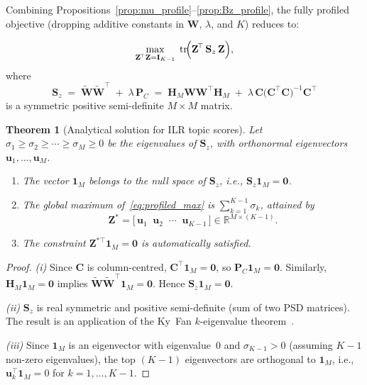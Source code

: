 \documentclass{article}
\newtheorem{theorem}{Theorem}
\DeclareMathOperator{\tr}{tr}
\begin{document}
Combining Propositions~\ref{prop:mu_profile}--\ref{prop:Bz_profile},
the fully profiled objective (dropping additive constants in
$\mathbf{W}$, $\lambda$, and $K$) reduces to:

\begin{equation}
  \max_{\mathbf{Z}^{\!\top}\mathbf{Z}=\mathbf{I}_{K-1}}\;
  \tr\!\Bigl(
    \mathbf{Z}^{\!\top}\,\mathbf{S}_z\,\mathbf{Z}
  \Bigr),
  \label{eq:profiled_max}
\end{equation}
where
\begin{equation}
  \boxed{\;
  \mathbf{S}_z
  \;=\;
  \widetilde{\mathbf{W}}\widetilde{\mathbf{W}}^{\!\top}
  \;+\;
  \lambda\,\mathbf{P}_C
  \;=\;
  \mathbf{H}_M\mathbf{W}\mathbf{W}^{\!\top}\mathbf{H}_M
  \;+\;
  \lambda\,\mathbf{C}
  \bigl(\mathbf{C}^{\!\top}\mathbf{C}\bigr)^{-1}
  \mathbf{C}^{\!\top}
  \;}
  \label{eq:Sz_matrix}
\end{equation}
is a symmetric positive semi-definite $M\times M$ matrix.

\begin{theorem}[Analytical solution for ILR topic scores]
\label{thm:spectral}
Let $\sigma_1\geq\sigma_2\geq\cdots\geq\sigma_M\geq 0$ be the
eigenvalues of $\mathbf{S}_z$, with orthonormal eigenvectors
$\mathbf{u}_1,\dots,\mathbf{u}_M$.
\begin{enumerate}
  \item[\emph{(i)}] The vector $\mathbf{1}_M$ belongs to the null space
    of $\mathbf{S}_z$, i.e.,
    $\mathbf{S}_z\mathbf{1}_M = \mathbf{0}$.
  \item[\emph{(ii)}] The global maximum
    of~\eqref{eq:profiled_max} is
    $\sum_{k=1}^{K-1}\sigma_k$, attained by
    \begin{equation}
      \mathbf{Z}^*
      = \bigl[\,\mathbf{u}_1\;\;\mathbf{u}_2\;\;\cdots\;\;
               \mathbf{u}_{K-1}\,\bigr]
      \in\mathbb{R}^{M\times(K-1)}.
      \label{eq:Z_star}
    \end{equation}
  \item[\emph{(iii)}] The constraint
    $\mathbf{Z}^{*\top}\mathbf{1}_M = \mathbf{0}$ is automatically
    satisfied.
\end{enumerate}
\end{theorem}

\begin{proof}
\emph{(i)} Since $\mathbf{C}$ is column-centred,
$\mathbf{C}^{\!\top}\mathbf{1}_M = \mathbf{0}$, so
$\mathbf{P}_C\mathbf{1}_M = \mathbf{0}$.
Similarly, $\mathbf{H}_M\mathbf{1}_M = \mathbf{0}$ implies
$\widetilde{\mathbf{W}}\widetilde{\mathbf{W}}^{\!\top}\mathbf{1}_M
= \mathbf{0}$. Hence $\mathbf{S}_z\mathbf{1}_M = \mathbf{0}$.

\emph{(ii)} $\mathbf{S}_z$ is real symmetric and positive semi-definite
(sum of two PSD matrices). The result is an application of the
Ky~Fan $k$-eigenvalue theorem~\citep{fan1949theorem}.

\emph{(iii)} Since $\mathbf{1}_M$ is an eigenvector with eigenvalue~0
and $\sigma_{K-1}>0$ (assuming $K{-}1$ non-zero eigenvalues), the top
$(K{-}1)$ eigenvectors are orthogonal to $\mathbf{1}_M$, i.e.,\
$\mathbf{u}_k^{\!\top}\mathbf{1}_M = 0$ for $k=1,\dots,K{-}1$.
\end{proof}
\end{document}
